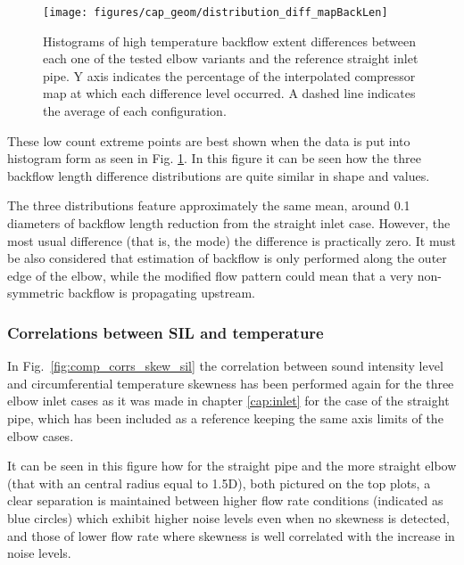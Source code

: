 \begin{figure}[htb!]
\centering
\texttt{[image: figures/cap\_geom/distribution\_diff\_mapBackLen]}
\caption{Histograms of high temperature backflow extent differences between each one of the tested elbow variants and the reference straight inlet pipe. Y axis indicates the percentage of the interpolated compressor map at which each difference level occurred. A dashed line indicates the average of each configuration.}
\label{fig:distribution_diff_backL}
\end{figure}

These low count extreme points are best shown when the data is put into histogram form as seen in Fig. \ref{fig:distribution_diff_backL}. In this figure it can be seen how the three backflow length difference distributions are quite similar in shape and values.

The three distributions feature approximately the same mean, around 0.1 diameters of backflow length reduction from the straight inlet case. However, the most usual difference (that is, the mode) the difference is practically zero. It must be also considered that estimation of backflow is only performed along the outer edge of the elbow, while the modified flow pattern could mean that a very non-symmetric backflow is propagating upstream.

\subsubsection{Correlations between SIL and temperature}

In Fig.~\ref{fig:comp_corrs_skew_sil} the correlation between sound intensity level and circumferential temperature skewness has been performed again for the three elbow inlet cases as it was made in chapter \ref{cap:inlet} for the case of the straight pipe, which has been included as a reference keeping the same axis limits of the elbow cases.

It can be seen in this figure how for the straight pipe and the more straight elbow (that with an central radius equal to 1.5D), both pictured on the top plots, a clear separation is maintained between higher flow rate conditions (indicated as blue circles) which exhibit higher noise levels even when no skewness is detected, and those of lower flow rate where skewness is well correlated with the increase in noise levels.

